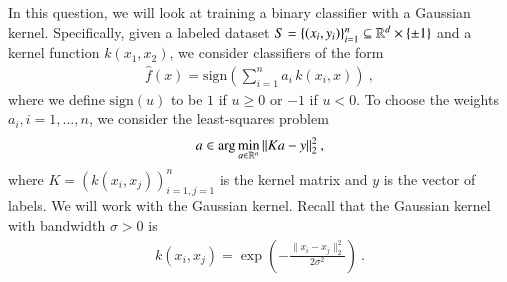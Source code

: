 
In this question, we will look at training a binary classifier with a Gaussian kernel.
Specifically, given a labeled dataset $S = \{(x_i, y_i)\}_{i=1}^{n} \subseteq \mathbb{R}^{d} \times \{\pm 1\}$
and a kernel function $k(x_1, x_2)$, we consider classifiers of the form
\begin{align*}
  \widehat{f}(x) = \mathrm{sign}\left( \sum_{i=1}^{n} a_i \, k(x_i, x)  \right) \:,
\end{align*}
where we define $\mathrm{sign}(u)$ to be $1$ if $u\geq 0$ or $-1$ if $u< 0$.
To choose the weights $a_i, i=1, ..., n$, we consider the least-squares problem
\begin{align}
  a \in \arg\min_{a \in \mathbb{R}^n} \| K a - y \|_2^2 \:, \label{eq:krr}
\end{align}
where $K = (k(x_i, x_j))_{i=1,j=1}^{n}$ is the kernel matrix and $y$ is the vector of
labels. We will work with the Gaussian kernel. Recall that the Gaussian kernel
with bandwidth $\sigma > 0$ is
\begin{align*}
  k(x_i, x_j) = \exp\left( - \frac{\| x_i - x_j \|^2_2}{2\sigma^2} \right) \:.
\end{align*}


